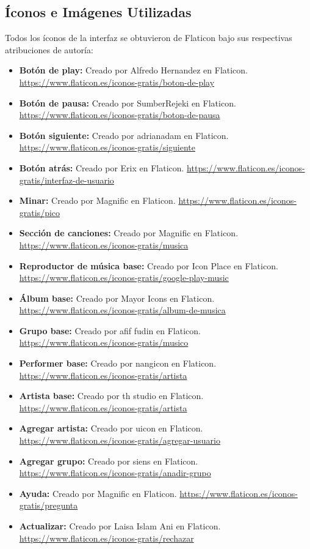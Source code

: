 \documentclass[11pt,a4paper]{article}
\begin{document}
    \subsection{Íconos e Imágenes Utilizadas}
    Todos los íconos de la interfaz se obtuvieron de Flaticon bajo sus respectivas atribuciones de autoría:
    \begin{itemize}
        \item \textbf{Botón de play:} Creado por Alfredo Hernandez en Flaticon. \url{https://www.flaticon.es/iconos-gratis/boton-de-play}
        \item \textbf{Botón de pausa:} Creado por SumberRejeki en Flaticon. \url{https://www.flaticon.es/iconos-gratis/boton-de-pausa}
        \item \textbf{Botón siguiente:} Creado por adrianadam en Flaticon. \url{https://www.flaticon.es/iconos-gratis/siguiente}
        \item \textbf{Botón atrás:} Creado por Erix en Flaticon. \url{https://www.flaticon.es/iconos-gratis/interfaz-de-usuario}
        \item \textbf{Minar:} Creado por Magnific en Flaticon. \url{https://www.flaticon.es/iconos-gratis/pico}
        \item \textbf{Sección de canciones:} Creado por Magnific en Flaticon. \url{https://www.flaticon.es/iconos-gratis/musica}
        \item \textbf{Reproductor de música base:} Creado por Icon Place en Flaticon. \url{https://www.flaticon.es/iconos-gratis/google-play-music}
        \item \textbf{Álbum base:} Creado por Mayor Icons en Flaticon. \url{https://www.flaticon.es/iconos-gratis/album-de-musica}
        \item \textbf{Grupo base:} Creado por afif fudin en Flaticon. \url{https://www.flaticon.es/iconos-gratis/musico}
        \item \textbf{Performer base:} Creado por nangicon en Flaticon. \url{https://www.flaticon.es/iconos-gratis/artista}
        \item \textbf{Artista base:} Creado por th studio en Flaticon. \url{https://www.flaticon.es/iconos-gratis/artista}
        \item \textbf{Agregar artista:} Creado por uicon en Flaticon. \url{https://www.flaticon.es/iconos-gratis/agregar-usuario}
        \item \textbf{Agregar grupo:} Creado por siens en Flaticon. \url{https://www.flaticon.es/iconos-gratis/anadir-grupo}
        \item \textbf{Ayuda:} Creado por Magnific en Flaticon. \url{https://www.flaticon.es/iconos-gratis/pregunta}
        \item \textbf{Actualizar:} Creado por Laisa Islam Ani en Flaticon. \url{https://www.flaticon.es/iconos-gratis/rechazar}
\end{itemize}
\end{document}
